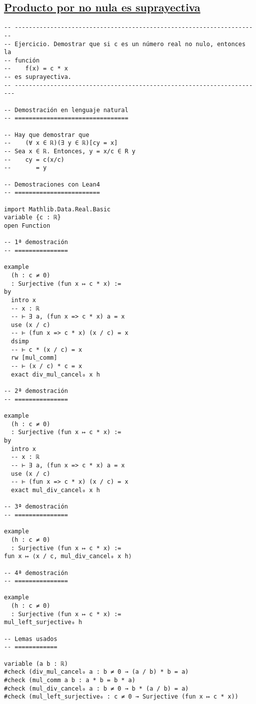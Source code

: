 \subsection{\href{./src/Logica/Producto\_por\_no\_nula\_es\_suprayectiva.lean}{Producto por no nula es suprayectiva}}
\label{sec:orgeab74bc}
\begin{verbatim}
-- ---------------------------------------------------------------------
-- Ejercicio. Demostrar que si c es un número real no nulo, entonces la
-- función
--    f(x) = c * x
-- es suprayectiva.
-- ----------------------------------------------------------------------

-- Demostración en lenguaje natural
-- ================================

-- Hay que demostrar que
--    (∀ x ∈ ℝ)(∃ y ∈ ℝ)[cy = x]
-- Sea x ∈ ℝ. Entonces, y = x/c ∈ R y
--    cy = c(x/c)
--       = y

-- Demostraciones con Lean4
-- ========================

import Mathlib.Data.Real.Basic
variable {c : ℝ}
open Function

-- 1ª demostración
-- ===============

example
  (h : c ≠ 0)
  : Surjective (fun x ↦ c * x) :=
by
  intro x
  -- x : ℝ
  -- ⊢ ∃ a, (fun x => c * x) a = x
  use (x / c)
  -- ⊢ (fun x => c * x) (x / c) = x
  dsimp
  -- ⊢ c * (x / c) = x
  rw [mul_comm]
  -- ⊢ (x / c) * c = x
  exact div_mul_cancel₀ x h

-- 2ª demostración
-- ===============

example
  (h : c ≠ 0)
  : Surjective (fun x ↦ c * x) :=
by
  intro x
  -- x : ℝ
  -- ⊢ ∃ a, (fun x => c * x) a = x
  use (x / c)
  -- ⊢ (fun x => c * x) (x / c) = x
  exact mul_div_cancel₀ x h

-- 3ª demostración
-- ===============

example
  (h : c ≠ 0)
  : Surjective (fun x ↦ c * x) :=
fun x ↦ ⟨x / c, mul_div_cancel₀ x h⟩

-- 4ª demostración
-- ===============

example
  (h : c ≠ 0)
  : Surjective (fun x ↦ c * x) :=
mul_left_surjective₀ h

-- Lemas usados
-- ============

variable (a b : ℝ)
#check (div_mul_cancel₀ a : b ≠ 0 → (a / b) * b = a)
#check (mul_comm a b : a * b = b * a)
#check (mul_div_cancel₀ a : b ≠ 0 → b * (a / b) = a)
#check (mul_left_surjective₀ : c ≠ 0 → Surjective (fun x ↦ c * x))
\end{verbatim}

